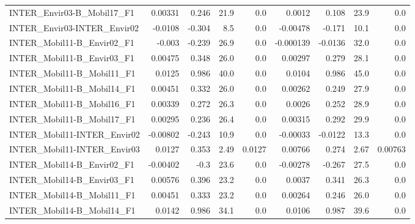 \begin{tabular}{lrrrrrrrr}
INTER\_Envir03-B\_Mobil17\_F1                &     0.00331 &        0.246 &    21.9 &      0.0 &     0.0012 &       0.108 &         23.9 &           0.0 \\
INTER\_Envir03-INTER\_Envir02               &     -0.0108 &       -0.304 &     8.5 &      0.0 &   -0.00478 &      -0.171 &         10.1 &           0.0 \\
INTER\_Mobil11-B\_Envir02\_F1                &      -0.003 &       -0.239 &    26.9 &      0.0 &  -0.000139 &     -0.0136 &         32.0 &           0.0 \\
INTER\_Mobil11-B\_Envir03\_F1                &     0.00475 &        0.348 &    26.0 &      0.0 &    0.00297 &       0.279 &         28.1 &           0.0 \\
INTER\_Mobil11-B\_Mobil11\_F1                &      0.0125 &        0.986 &    40.0 &      0.0 &     0.0104 &       0.986 &         45.0 &           0.0 \\
INTER\_Mobil11-B\_Mobil14\_F1                &     0.00451 &        0.332 &    26.0 &      0.0 &    0.00262 &       0.249 &         27.9 &           0.0 \\
INTER\_Mobil11-B\_Mobil16\_F1                &     0.00339 &        0.272 &    26.3 &      0.0 &     0.0026 &       0.252 &         28.9 &           0.0 \\
INTER\_Mobil11-B\_Mobil17\_F1                &     0.00295 &        0.236 &    26.4 &      0.0 &    0.00315 &       0.292 &         29.9 &           0.0 \\
INTER\_Mobil11-INTER\_Envir02               &    -0.00802 &       -0.243 &    10.9 &      0.0 &   -0.00033 &     -0.0122 &         13.3 &           0.0 \\
INTER\_Mobil11-INTER\_Envir03               &      0.0127 &        0.353 &    2.49 &   0.0127 &    0.00766 &       0.274 &         2.67 &       0.00763 \\
INTER\_Mobil14-B\_Envir02\_F1                &    -0.00402 &         -0.3 &    23.6 &      0.0 &   -0.00278 &      -0.267 &         27.5 &           0.0 \\
INTER\_Mobil14-B\_Envir03\_F1                &     0.00576 &        0.396 &    23.2 &      0.0 &     0.0037 &       0.341 &         26.3 &           0.0 \\
INTER\_Mobil14-B\_Mobil11\_F1                &     0.00451 &        0.333 &    23.2 &      0.0 &    0.00264 &       0.246 &         26.0 &           0.0 \\
INTER\_Mobil14-B\_Mobil14\_F1                &      0.0142 &        0.986 &    34.1 &      0.0 &     0.0106 &       0.987 &         39.6 &           0.0 \\

\end{tabular}
